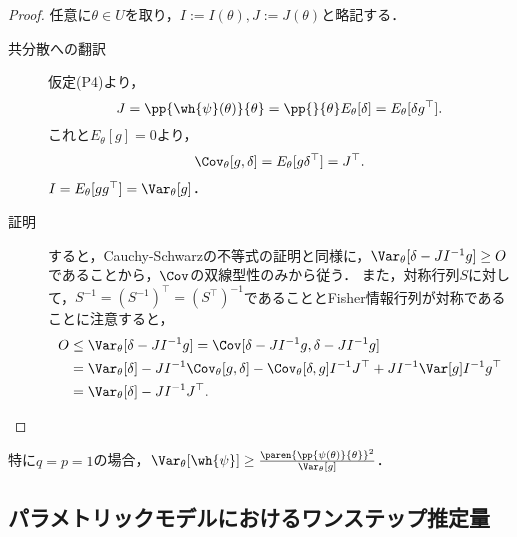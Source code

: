 \documentclass[uplatex, dvipdfmx]{jsarticle}
\begin{document}
\begin{proof}
    任意に$\theta\in U$を取り，$I:=I(\theta),J:=J(\theta)$と略記する．
    \begin{description}
        \item[共分散への翻訳] 仮定(P4)より，
        \[J=\pp{\wh{\psi}(\theta)}{\theta}=\pp{}{\theta}E_\theta[\delta]=E_\theta[\delta g^\top].\]
        これと$E_\theta[g]=0$より，
        \[\Cov_\theta[g,\delta]=E_\theta[g\delta^\top]=J^\top.\]
        $I=E_\theta[gg^\top]=\Var_\theta[g]$．
        \item[証明] すると，Cauchy-Schwarzの不等式の証明と同様に，$\Var_\theta[\delta-JI^{-1}g]\ge O$であることから，$\Cov$の双線型性のみから従う．
        また，対称行列$S$に対して，$S^{-1}=(S^{-1})^\top=(S^\top)^{-1}$であることとFisher情報行列が対称であることに注意すると，
        \begin{align*}
            O&\le\Var_\theta[\delta-JI^{-1}g]=\Cov[\delta-JI^{-1}g,\delta-JI^{-1}g]\\
            &=\Var_\theta[\delta]-JI^{-1}\Cov_\theta[g,\delta]-\Cov_\theta[\delta,g]I^{-1} J^\top+JI^{-1}\Var[g]I^{-1}g^\top\\
            &=\Var_\theta[\delta]-JI^{-1}J^\top.
        \end{align*}
    \end{description}
\end{proof}


\begin{corollary}\label{cor-Cramer-Rao}
    特に$q=p=1$の場合，$\Var_\theta[\wh{\psi}]\ge\frac{\paren{\pp{\psi(\theta)}{\theta}}^2}{\Var_\theta[g]}$．
\end{corollary}

\subsection{パラメトリックモデルにおけるワンステップ推定量}

\begin{tcolorbox}[colframe=ForestGreen, colback=ForestGreen!10!white,breakable,colbacktitle=ForestGreen!40!white,coltitle=black,fonttitle=\bfseries\sffamily,
title=]
    
\end{tcolorbox}
\end{document}
